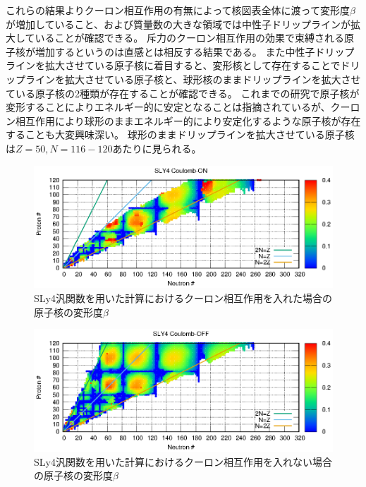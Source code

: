 \documentclass[12pt]{jarticle}
\begin{document}
これらの結果よりクーロン相互作用の有無によって核図表全体に渡って変形度$\beta$が増加していること、および質量数の大きな領域では中性子ドリップラインが拡大していることが確認できる。
斥力のクーロン相互作用の効果で束縛される原子核が増加するというのは直感とは相反する結果である。
また中性子ドリップラインを拡大させている原子核に着目すると、変形核として存在することでドリップラインを拡大させている原子核と、球形核のままドリップラインを拡大させている原子核の2種類が存在することが確認できる。
これまでの研究で原子核が変形することによりエネルギー的に安定となることは指摘されているが、クーロン相互作用により球形のままエネルギー的により安定化するような原子核が存在することも大変興味深い。
球形のままドリップラインを拡大させている原子核は$Z=50,N=116-120$あたりに見られる。
\begin{figure}[ht]
    \centering
    \includegraphics{../SLY4_ON.eps}
    \setlength\floatsep{0pt}
    \setlength\intextsep{0pt} 
    \setlength\textfloatsep{0pt}
    \caption{SLy4汎関数を用いた計算におけるクーロン相互作用を入れた場合の原子核の変形度$\beta$}\label{fig:SLY4_ON}
\end{figure}
\begin{figure}[H]
    \centering
    \includegraphics{../SLY4_OFF.eps}
    \setlength\floatsep{0pt}
    \caption{SLy4汎関数を用いた計算におけるクーロン相互作用を入れない場合の原子核の変形度$\beta$}\label{fig:SLY4_OFF}
\end{figure}
\end{document}
